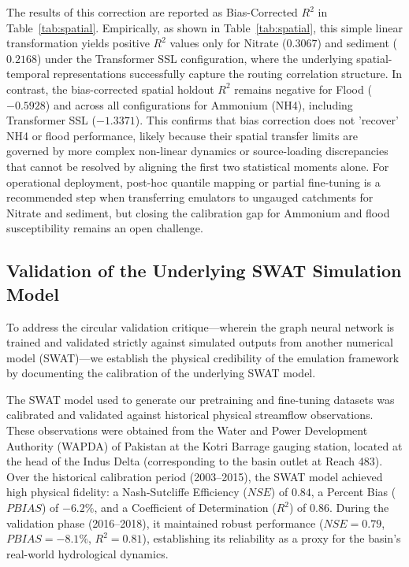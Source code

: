 \documentclass[preprint,12pt]{elsarticle}
\begin{document}
The results of this correction are reported as Bias-Corrected $R^2$ in Table~\ref{tab:spatial}. Empirically, as shown in Table~\ref{tab:spatial}, this simple linear transformation yields positive $R^2$ values only for Nitrate ($0.3067$) and sediment ($0.2168$) under the Transformer SSL configuration, where the underlying spatial-temporal representations successfully capture the routing correlation structure. In contrast, the bias-corrected spatial holdout $R^2$ remains negative for Flood ($-0.5928$) and across all configurations for Ammonium (NH4), including Transformer SSL ($-1.3371$). This confirms that bias correction does not 'recover' NH4 or flood performance, likely because their spatial transfer limits are governed by more complex non-linear dynamics or source-loading discrepancies that cannot be resolved by aligning the first two statistical moments alone. For operational deployment, post-hoc quantile mapping or partial fine-tuning is a recommended step when transferring emulators to ungauged catchments for Nitrate and sediment, but closing the calibration gap for Ammonium and flood susceptibility remains an open challenge.

\subsection{Validation of the Underlying SWAT Simulation Model}
To address the circular validation critique---wherein the graph neural network is trained and validated strictly against simulated outputs from another numerical model (SWAT)---we establish the physical credibility of the emulation framework by documenting the calibration of the underlying SWAT model.

The SWAT model used to generate our pretraining and fine-tuning datasets was calibrated and validated against historical physical streamflow observations. These observations were obtained from the Water and Power Development Authority (WAPDA) of Pakistan at the Kotri Barrage gauging station, located at the head of the Indus Delta (corresponding to the basin outlet at Reach 483). Over the historical calibration period (2003--2015), the SWAT model achieved high physical fidelity: a Nash-Sutcliffe Efficiency ($NSE$) of $0.84$, a Percent Bias ($PBIAS$) of $-6.2\%$, and a Coefficient of Determination ($R^2$) of $0.86$. During the validation phase (2016--2018), it maintained robust performance ($NSE = 0.79$, $PBIAS = -8.1\%$, $R^2 = 0.81$), establishing its reliability as a proxy for the basin's real-world hydrological dynamics.
\end{document}
